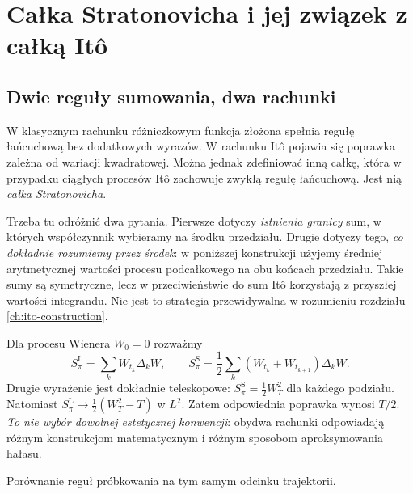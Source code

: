 \chapter{Całka Stratonovicha i jej związek z całką Itô}
\label{ch:stratonovich}

\section{Dwie reguły sumowania, dwa rachunki}
W klasycznym rachunku różniczkowym funkcja złożona
spełnia regułę łańcuchową bez dodatkowych wyrazów.
W rachunku Itô pojawia się poprawka zależna od wariacji
kwadratowej. Można jednak zdefiniować inną całkę,
która w przypadku ciągłych procesów Itô zachowuje
zwykłą regułę łańcuchową. Jest nią \emph{całka
Stratonovicha}.

Trzeba tu odróżnić dwa pytania. Pierwsze dotyczy
\emph{istnienia granicy} sum, w których współczynnik
wybieramy na środku przedziału. Drugie dotyczy tego,
\emph{co dokładnie rozumiemy przez środek}: w poniższej
konstrukcji użyjemy średniej arytmetycznej wartości
procesu podcałkowego na obu końcach przedziału.
Takie sumy są symetryczne, lecz w przeciwieństwie do
sum Itô korzystają z przyszłej wartości integrandu.
Nie jest to strategia przewidywalna w rozumieniu
rozdziału \ref{ch:ito-construction}.

\begin{przyklad}
Dla procesu Wienera $W_0=0$ rozważmy
\[
S_\pi^{\mathrm L}=\sum_kW_{t_k}\Delta_kW,
\qquad
S_\pi^{\mathrm S}=
\frac12\sum_k(W_{t_k}+W_{t_{k+1}})\Delta_kW.
\]
Drugie wyrażenie jest dokładnie teleskopowe:
$S_\pi^{\mathrm S}=\frac12W_T^2$ dla każdego podziału.
Natomiast $S_\pi^{\mathrm L}\to\frac12(W_T^2-T)$
w $L^2$. Zatem odpowiednia poprawka wynosi $T/2$.
\emph{To nie wybór dowolnej estetycznej konwencji}:
obydwa rachunki odpowiadają różnym konstrukcjom
matematycznym i różnym sposobom aproksymowania hałasu.
\end{przyklad}

\begin{center}
\par\smallskip\small Porównanie reguł próbkowania na tym samym odcinku trajektorii.
\end{center}

